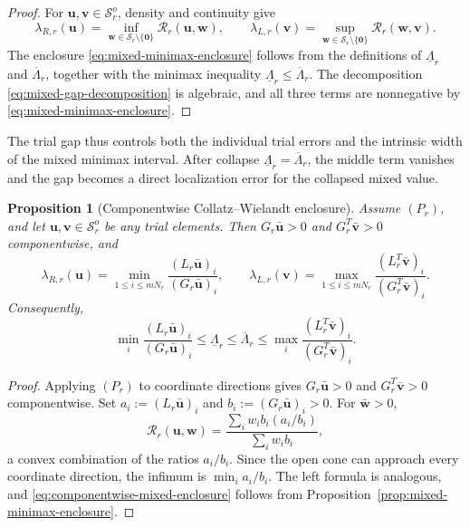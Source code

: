 \documentclass[preprint,10pt]{elsarticle}
\theoremstyle{plain}
\newtheorem{proposition}{Proposition}
\theoremstyle{definition}
\theoremstyle{remark}
\begin{document}
\begin{proof}
	For $\mathbf{u},\mathbf{v}\in\mathcal{S}_r^o$, density and continuity give
	\[
	\lambda_{R,r}(\mathbf{u})
	= \inf_{\mathbf{w}\in\mathcal{S}_r\setminus\{\mathbf{0}\}}
	\mathcal{R}_r(\mathbf{u},\mathbf{w}),
	\qquad
	\lambda_{L,r}(\mathbf{v})
	= \sup_{\mathbf{w}\in\mathcal{S}_r\setminus\{\mathbf{0}\}}
	\mathcal{R}_r(\mathbf{w},\mathbf{v}).
	\]
	The enclosure \eqref{eq:mixed-minimax-enclosure} follows from the definitions
	of $\underline\Lambda_r$ and $\overline\Lambda_r$, together with the minimax
	inequality $\underline\Lambda_r\le\overline\Lambda_r$. The decomposition
	\eqref{eq:mixed-gap-decomposition} is algebraic, and all three terms are
	nonnegative by \eqref{eq:mixed-minimax-enclosure}.
\end{proof}

The trial gap thus controls both the individual trial errors and the intrinsic
width of the mixed minimax interval. After collapse
$\underline\Lambda_r=\overline\Lambda_r$, the middle term vanishes and the gap
becomes a direct localization error for the collapsed mixed value.

\begin{proposition}[Componentwise Collatz--Wielandt enclosure]
	\label{prop:componentwise-mixed-enclosure}
	Assume $(P_r)$, and let
	$\mathbf{u},\mathbf{v}\in\mathcal{S}_r^o$ be any trial elements. Then
	$G_r\bar{\mathbf{u}}>0$ and $G_r^T\bar{\mathbf{v}}>0$ componentwise, and
	\begin{equation}\label{eq:componentwise-right-left-bound}
		\lambda_{R,r}(\mathbf{u})
		= \min_{1\le i\le mN_r}
		\frac{(L_r\bar{\mathbf{u}})_i}{(G_r\bar{\mathbf{u}})_i},
		\qquad
		\lambda_{L,r}(\mathbf{v})
		= \max_{1\le i\le mN_r}
		\frac{(L_r^T\bar{\mathbf{v}})_i}{(G_r^T\bar{\mathbf{v}})_i}.
	\end{equation}
	Consequently,
	\begin{equation}\label{eq:componentwise-mixed-enclosure}
		\min_i\frac{(L_r\bar{\mathbf{u}})_i}{(G_r\bar{\mathbf{u}})_i}
		\le \underline\Lambda_r \le \overline\Lambda_r
		\le \max_i\frac{(L_r^T\bar{\mathbf{v}})_i}{(G_r^T\bar{\mathbf{v}})_i}.
	\end{equation}
\end{proposition}

\begin{proof}
	Applying $(P_r)$ to coordinate directions gives
	$G_r\bar{\mathbf{u}}>0$ and $G_r^T\bar{\mathbf{v}}>0$ componentwise. Set
	$a_i:=(L_r\bar{\mathbf{u}})_i$ and $b_i:=(G_r\bar{\mathbf{u}})_i>0$. For
	$\bar{\mathbf{w}}>0$,
	\[
	\mathcal{R}_r(\mathbf{u},\mathbf{w})
	= \frac{\sum_i w_i b_i(a_i/b_i)}{\sum_i w_i b_i},
	\]
	a convex combination of the ratios $a_i/b_i$. Since the open cone can
	approach every coordinate direction, the infimum is $\min_i a_i/b_i$.
	The left formula is analogous, and \eqref{eq:componentwise-mixed-enclosure}
	follows from Proposition~\ref{prop:mixed-minimax-enclosure}.
\end{proof}
\end{document}
